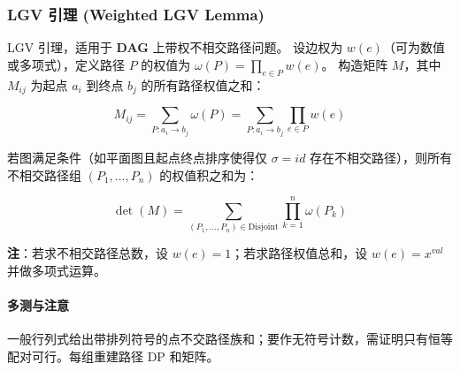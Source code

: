 \subsubsection{LGV 引理 (Weighted LGV Lemma)}

LGV 引理，适用于 \textbf{DAG} 上带权不相交路径问题。
设边权为 $w(e)$（可为数值或多项式），定义路径 $P$ 的权值为 $\omega(P) = \prod_{e \in P} w(e)$。
构造矩阵 $M$，其中 $M_{ij}$ 为起点 $a_i$ 到终点 $b_j$ 的所有路径权值之和：

$$
M_{ij} = \sum_{P: a_i \to b_j} \omega(P) = \sum_{P: a_i \to b_j} \prod_{e \in P} w(e)
$$

若图满足条件（如平面图且起点终点排序使得仅 $\sigma=id$ 存在不相交路径），则所有不相交路径组 $(P_1, \dots, P_n)$ 的权值积之和为：

$$
\det(M) = \sum_{(P_1, \dots, P_n) \in \text{Disjoint}} \prod_{k=1}^n \omega(P_k)
$$

\noindent \textbf{注}：若求不相交路径总数，设 $w(e)=1$；若求路径权值总和，设 $w(e)=x^{val}$ 并做多项式运算。

\paragraph{多测与注意} 一般行列式给出带排列符号的点不交路径族和；要作无符号计数，需证明只有恒等配对可行。每组重建路径 DP 和矩阵。
